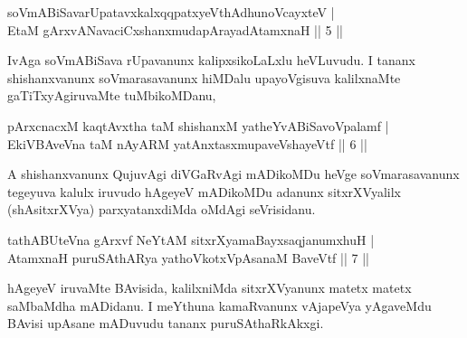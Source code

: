 
\begin{shl}
\footnotemark[1]soVmABiSavarUpatavxkalxqqpatxyeV\s thAdhunoVcayxteV | \\
EtaM gArxvANavaciCxshanxmudapArayadAtamxnaH \hfill|| 5 || 
\end{shl}

\begin{artha}
IvAga soVmABiSava rUpavanunx kalipxsikoLaLxlu heVLuvudu. I tananx 
shishanxvanunx soVmarasavanunx hiMDalu upayoVgisuva kalilxnaMte 
gaTiTxyAgiruvaMte tuMbikoMDanu,
\end{artha}


\begin{shl}
pArxcnacxM kaqtAvx\s tha taM shishanxM yatheYvABiSavoVpalamf | \\
EkiVBAveVna taM nAyARM yatAnxtasxmupaveVshayeVtf \hfill|| 6 || 
\end{shl}

\begin{artha}
A shishanxvanunx QujuvAgi diVGaRvAgi mADikoMDu heVge soVmarasavanunx 
tegeyuva kalulx iruvudo hAgeyeV mADikoMDu adanunx sitxrXVyalilx 
(shAsitxrXVya) parxyatanxdiMda oMdAgi seVrisidanu.
\end{artha}


\begin{shl}
tathABUteVna gArxvf NeYtAM sitxrXyamaBayxsaqjanumxhuH | \\
AtamxnaH puruSAthARya yathoVkotxVpAsanaM BaveVtf \hfill|| 7 || 
\end{shl}

\begin{artha}
hAgeyeV iruvaMte BAvisida, kalilxniMda sitxrXVyanunx matetx matetx 
saMbaMdha mADidanu. I meYthuna kamaRvanunx vAjapeVya yAgaveMdu BAvisi 
upAsane mADuvudu tananx puruSAthaRkAkxgi.
\end{artha}


